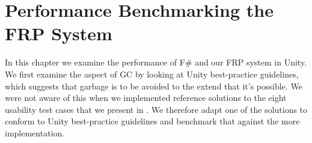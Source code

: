 \section{Performance Benchmarking the FRP System}
In this chapter we examine the performance of F\# and our \gls{FRP} system in Unity. We first examine the aspect of \gls{GC} by looking at Unity best-practice guidelines, which suggests that garbage is to be avoided to the extend that it's possible. We were not aware of this when we implemented reference solutions to the eight usability test cases that we present in . We therefore adapt one of the solutions to conform to Unity best-practice guidelines and benchmark that against the more  implementation.


